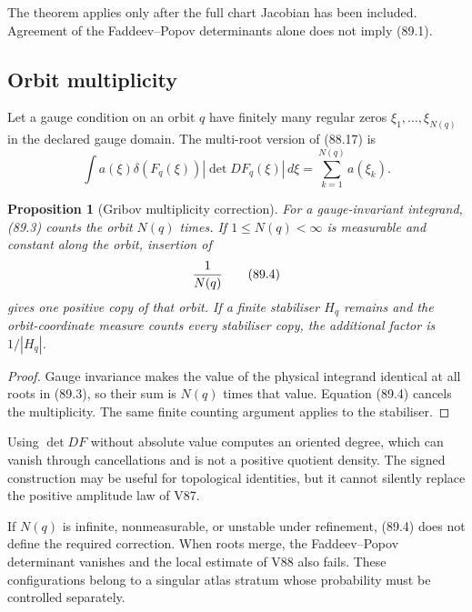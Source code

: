 \documentclass[11pt]{article}
\newtheorem{proposition}[theorem]{Proposition}
\begin{document}
The theorem applies only after the full chart Jacobian has been
included.  Agreement of the Faddeev--Popov determinants alone does
not imply (89.1).

\subsection{Orbit multiplicity}

Let a gauge condition on an orbit \(q\) have finitely many regular
zeros \(\xi_1,\ldots,\xi_{N(q)}\) in the declared gauge domain.
The multi-root version of (88.17) is
\[
 \int a(\xi)\delta(F_q(\xi))
             |\det DF_q(\xi)|\,d\xi
                      =\sum_{k=1}^{N(q)}a(\xi_k).            \tag{89.3}
\]

\begin{proposition}[Gribov multiplicity correction]
\label{prop:v11v89-multiplicity}
For a gauge-invariant integrand, (89.3) counts the orbit \(N(q)\)
times.  If \(1\le N(q)<\infty\) is measurable and constant along the
orbit, insertion of
\[
                                      {1\over N(q)}          \tag{89.4}
\]
gives one positive copy of that orbit.  If a finite stabiliser
\(H_q\) remains and the orbit-coordinate measure counts every
stabiliser copy, the additional factor is \(1/|H_q|\).
\end{proposition}

\begin{proof}
Gauge invariance makes the value of the physical integrand identical
at all roots in (89.3), so their sum is \(N(q)\) times that value.
Equation (89.4) cancels the multiplicity.  The same finite counting
argument applies to the stabiliser.
\end{proof}

Using \(\det DF\) without absolute value computes an oriented degree,
which can vanish through cancellations and is not a positive quotient
density.  The signed construction may be useful for topological
identities, but it cannot silently replace the positive amplitude law
of V87.

\begin{warning}
\label{warn:v11v89-multiplicity}
If \(N(q)\) is infinite, nonmeasurable, or unstable under refinement,
(89.4) does not define the required correction.  When roots merge,
the Faddeev--Popov determinant vanishes and the local estimate of V88
also fails.  These configurations belong to a singular atlas stratum
whose probability must be controlled separately.
\end{warning}
\end{document}
